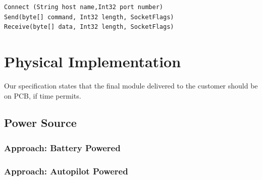 \begin{lstlisting}[caption=Socket class connect receive and send method,label=socketClasscrs]
Connect (String host name,Int32 port number)
Send(byte[] command, Int32 length, SocketFlags)
Receive(byte[] data, Int32 length, SocketFlags)
\end{lstlisting}

\section{Physical Implementation}

Our specification states that the final module delivered to the customer 
should be on PCB, if time permits. 
	
\subsection{Power Source}

\subsubsection{Approach: Battery Powered}

\subsubsection{Approach: Autopilot Powered}

